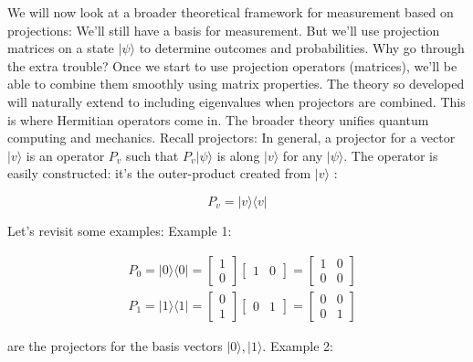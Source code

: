 \documentclass[main.tex]{subfiles}
\begin{document}
    We will now look at a broader theoretical framework for measurement based on projections: We'll still have a basis for measurement. But we'll use projection matrices on a state $|\psi\rangle$ to determine outcomes and probabilities. Why go through the extra trouble? Once we start to use projection operators (matrices), we'll be able to combine them smoothly using matrix properties. The theory so developed will naturally extend to including eigenvalues when projectors are combined. This is where Hermitian operators come in. The broader theory unifies quantum computing and mechanics. Recall projectors: In general, a projector for a vector $|v\rangle$ is an operator $P_{v}$ such that $P_{v}|\psi\rangle$ is along $|v\rangle$ for any $|\psi\rangle$. The operator is easily constructed: it's the outer-product created from $|v\rangle$ :
    
    $$
    P_{v}=|v\rangle\langle v|
    $$
    
    Let's revisit some examples: Example 1:
    
    $$
    \begin{aligned}
    &P_{0}=|0\rangle\langle 0|=\left[\begin{array}{l}
    1 \\
    0
    \end{array}\right]\left[\begin{array}{ll}
    1 & 0
    \end{array}\right]=\left[\begin{array}{ll}
    1 & 0 \\
    0 & 0
    \end{array}\right] \\
    &P_{1}=|1\rangle\langle 1|=\left[\begin{array}{l}
    0 \\
    1
    \end{array}\right]\left[\begin{array}{ll}
    0 & 1
    \end{array}\right]=\left[\begin{array}{ll}
    0 & 0 \\
    0 & 1
    \end{array}\right]
    \end{aligned}
    $$
    
    are the projectors for the basis vectors $|0\rangle,|1\rangle$. Example 2:
    
\end{document}

